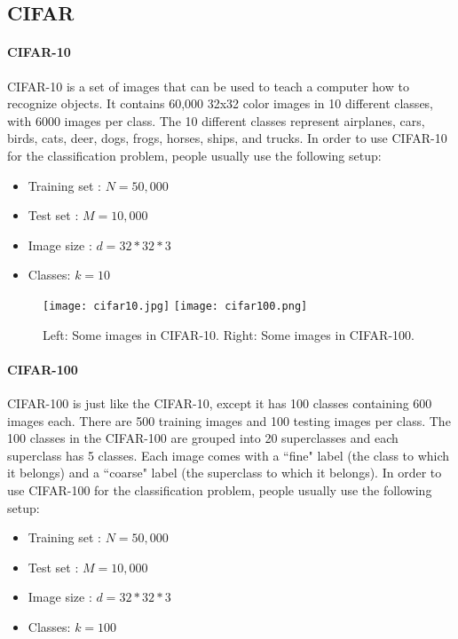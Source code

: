 {\break
\subsection{CIFAR}
\paragraph{CIFAR-10}
CIFAR-10\cite{krizhevsky2009learning} is a set of images that can be used to teach a computer how to recognize objects. It contains 60,000 32x32 color images in 10 different classes,  with 6000 images per class. The 10 different classes represent airplanes, cars, birds, cats, deer, dogs, frogs, horses, ships, and trucks. In order to use CIFAR-10 for the classification problem, people usually use the following setup:
\begin{itemize}
	\item Training set : $N = 50,000$
	\item Test set : $M = 10,000$
	\item Image size : $d  = 32*32*3$
	\item Classes: $k = 10$
\end{itemize}
\begin{figure}[H]
	\begin{center}
		\texttt{[image: cifar10.jpg]}
		\texttt{[image: cifar100.png]}
		\label{Fig: CIFAR-10}
		\caption{Left: Some images in CIFAR-10. Right: Some images in CIFAR-100.}
	\end{center}
\end{figure}


\break

\paragraph{CIFAR-100}
CIFAR-100\cite{krizhevsky2009learning} is just like the CIFAR-10, except it has 100 classes containing 600 images each. There are 500 training images and 100 testing images per class. The 100 classes in the CIFAR-100 are grouped into 20 superclasses and each superclass has 5 classes. Each image comes with a ``fine" label (the class to which it belongs) and a ``coarse" label (the superclass to which it belongs). In order to use CIFAR-100 for the classification problem, people usually use the following setup:

\begin{itemize}
	\item Training set : $N = 50,000$
	\item Test set : $M = 10,000$
	\item Image size : $d = 32*32*3$
	\item Classes: $k = 100$
	\end{itemize}

}
